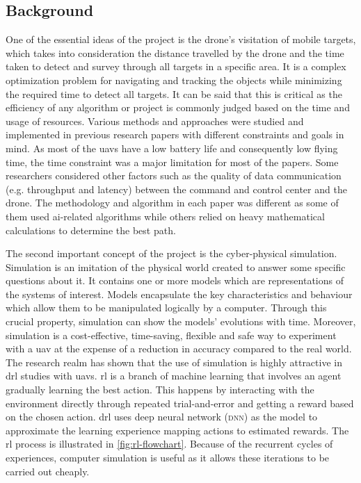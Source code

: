 \documentclass[../main.tex]{subfiles}
\begin{document}
\subsection{Background}

One of the essential ideas of the project 
is the drone's visitation of mobile 
targets, which takes into consideration 
the distance travelled by the drone and 
the time taken to detect and survey 
through all targets in a specific area.
It is a complex optimization problem 
for navigating and tracking the objects 
while minimizing the required time to detect all targets.
It can be said that this is critical as the 
efficiency of any algorithm 
or project is commonly judged based on the time 
and usage of resources.
Various methods and approaches were studied 
and implemented 
in previous research papers with different 
constraints and 
goals in mind.
As most of the \glspl{uav} have a low battery life 
and consequently low flying time, the time 
constraint was a major limitation 
for most of the papers. 
Some researchers considered other factors such 
as the quality 
of data communication (e.g. throughput and latency) 
between the command and control 
center and the drone.
The methodology and algorithm in each paper was 
different 
as some of them used \gls{ai}-related algorithms while 
others relied 
on heavy mathematical calculations to determine 
the best path.

The second important concept of the project is the cyber-physical simulation.
Simulation is an imitation of the physical world
created to answer some specific questions about it.
It contains one or more models 
which are representations of the systems of interest.
Models encapsulate the key characteristics and behaviour 
which allow them to be manipulated logically by a computer.
Through this crucial property, simulation can show 
the models' evolutions with time.
Moreover, simulation is a cost-effective, time-saving, flexible 
and safe way to experiment with a \gls{uav}
at the expense of a reduction in accuracy compared to the real world.
The research realm has shown that the use of simulation 
is highly attractive in \gls{drl} studies with \glspl{uav}.
\gls{rl} is a branch of machine learning that involves
an agent gradually learning the best action. This happens by 
interacting with 
the environment directly through repeated trial-and-error
and getting a reward based on the chosen action.
\gls{drl} uses deep neural network (\textsc{dnn}) as the
model to approximate the learning experience mapping
actions to estimated rewards.
The \gls{rl} process is illustrated in 
\cref{fig:rl-flowchart}.
Because of the recurrent cycles of experiences, 
computer simulation is useful as it
allows these iterations to be carried out cheaply.
\end{document}
